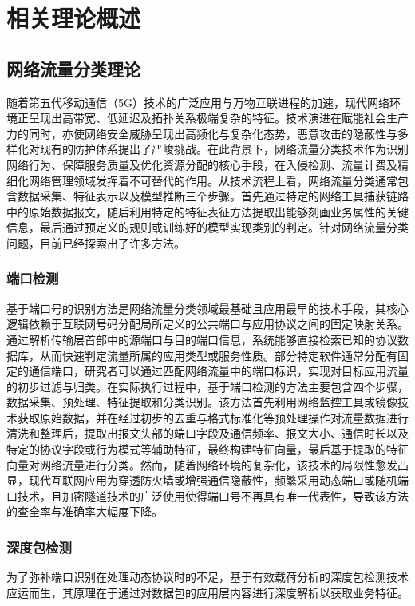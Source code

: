 
\chapter{相关理论概述}

\section{网络流量分类理论}
随着第五代移动通信（5G）技术的广泛应用与万物互联进程的加速，现代网络环境正呈现出高带宽、低延迟及拓扑关系极端复杂的特征。技术演进在赋能社会生产力的同时，亦使网络安全威胁呈现出高频化与复杂化态势，恶意攻击的隐蔽性与多样化对现有的防护体系提出了严峻挑战\cite{su2021secure,tang2019future}。在此背景下，网络流量分类技术作为识别网络行为、保障服务质量及优化资源分配的核心手段，在入侵检测、流量计费及精细化网络管理领域发挥着不可替代的作用\cite{hou2021incentive,zhang2020physical,gui20206g}。从技术流程上看，网络流量分类通常包含数据采集、特征表示以及模型推断三个步骤\cite{coulter2019data,zhang2022novel}。首先通过特定的网络工具捕获链路中的原始数据报文，随后利用特定的特征表征方法提取出能够刻画业务属性的关键信息，最后通过预定义的规则或训练好的模型实现类别的判定。针对网络流量分类问题，目前已经探索出了许多方法。
\subsection{端口检测}
基于端口号的识别方法是网络流量分类领域最基础且应用最早的技术手段，其核心逻辑依赖于互联网号码分配局所定义的公共端口与应用协议之间的固定映射关系。通过解析传输层首部中的源端口与目的端口信息，系统能够直接检索已知的协议数据库，从而快速判定流量所属的应用类型或服务性质。部分特定软件通常分配有固定的通信端口，研究者可以通过匹配网络流量中的端口标识，实现对目标应用流量的初步过滤与归类\cite{li2009efficient}。在实际执行过程中，基于端口检测的方法主要包含四个步骤，数据采集、预处理、特征提取和分类识别。该方法首先利用网络监控工具或镜像技术获取原始数据，并在经过初步的去重与格式标准化等预处理操作对流量数据进行清洗和整理后，提取出报文头部的端口字段及通信频率、报文大小、通信时长以及特定的协议字段或行为模式等辅助特征，最终构建特征向量，最后基于提取的特征向量对网络流量进行分类。然而，随着网络环境的复杂化，该技术的局限性愈发凸显，现代互联网应用为穿透防火墙或增强通信隐蔽性，频繁采用动态端口或随机端口技术，且加密隧道技术的广泛使用使得端口号不再具有唯一代表性，导致该方法的查全率与准确率大幅度下降。

\subsection{深度包检测}
为了弥补端口识别在处理动态协议时的不足，基于有效载荷分析的深度包检测技术应运而生，其原理在于通过对数据包的应用层内容进行深度解析以获取业务特征\cite{dreger2006dynamic}。

